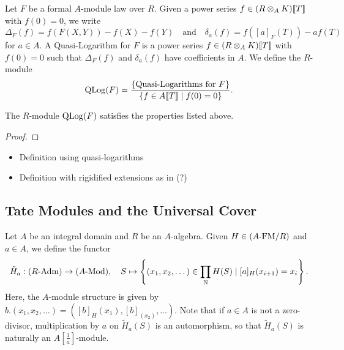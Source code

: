\documentclass[../main.tex]{subfiles}
\begin{document}
\begin{defi}
  Let $F$ be a formal $A$-module law over $R$. Given a power series $f \in
  (R \otimes_A K)\llbracket T \rrbracket$ with $f(0) = 0$, we write 
  \begin{equation*}
    \Delta_F(f) = f(F(X,Y)) - f(X) - f(Y) \quad \text{and} \quad
    \delta_a (f) = f([a]_F(T)) - af(T)
  \end{equation*}
  for $a \in A$.
  A Quasi-Logarithm for $F$ is a power series $f \in (R \otimes_A K)\llbracket T \rrbracket$
  with $f(0) = 0$ such that $\Delta_F(f)$ and $\delta_a(f)$ have coefficients
  in $A$. We define the $R$-module
  \begin{equation*}
    \operatorname {QLog}(F) = \frac{\{\text{Quasi-Logarithms for $F$}\}}{\{f \in A\llbracket T
    \rrbracket \mid f(0) = 0\}}.
  \end{equation*}
\end{defi}

\begin{prop}
  The $R$-module $\operatorname {QLog}(F)$ satisfies the properties listed above. 
\begin{proof}
\end{proof}
\end{prop}

\begin{itemize}
  \item Definition using quasi-logarithms
  \item Definition with rigidified extensions as in \cite{hopkins1994equivariant} (?)
\end{itemize}

\subsection{Tate Modules and the Universal Cover} %
\label{sub:Tate Modules and the Universal Cover}
Let $A$ be an integral domain and $R$ be an $A$-algebra. Given $H \in {({A}\text-\mathrm{FM}/{R})}$ and $a \in A$,
we define the functor 
\begin{equation*}
  \Tilde H_a : {({R}\text-\mathrm{Adm})} \to {({A}\text-\mathrm{Mod})}, \quad
  S \mapsto \left\{(x_1, x_2, \dots) \in \prod_{\mathbb{N}} H(S) \mid [a]_H(x_{i+1}) =
  x_i \right\}.
\end{equation*}
Here, the $A$-module structure is given by $b.(x_1, x_2,\dots) = ([b]_H(x_1), [b]_(x_2),
\dots)$. Note that if $a \in A$ is not a zero-divisor, 
multiplication by $a$ on $\tilde H_a(S)$ is an automorphism, so that 
$\tilde H_a(S)$ is naturally an $A[\frac1a]$-module.
\end{document}

